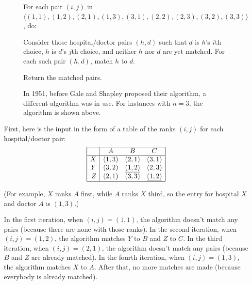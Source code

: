 \documentclass[11pt]{article}
\begin{document}
\begin{figure}
\begin{myframed}

\begin{steps}
  \step For each pair $(i,j)$ in $\langle (1,1), (1,2), (2,1), (1,3), (3,1), (2,2), (2,3), (3,2), (3,3) \rangle$, do:

  \begin{steps}
    \step Consider those hospital/doctor pairs $(h, d)$ such that $d$ is $h$'s $i$th choice,
    $h$ is $d$'s $j$th choice, and neither $h$ nor $d$ are yet matched.
    For each such pair $(h, d)$, match $h$ to $d$.
  \end{steps}

  \step Return the matched pairs.
\end{steps}

\end{myframed}
\caption{In 1951, before Gale and Shapley proposed their algorithm, a different algorithm was in use.  
  For instances with $n=3$, the algorithm is shown above.}\label{matching: fig: other alg}
\end{figure}

\solution
First, here is the input in the form of a table of the ranks $(i, j)$ for each hospital/doctor pair:
\[
\begin{array}{|r|ccc|} \hline
   & A & B & C \\ \hline
  X & (1,3) & (2,1) & (3,1) \\
  Y & (3,2) & \underline{(1,2)} & (2,3)\\
  Z & (2,1) & (3,3) & \underline{(1,2)} \\ \hline
\end{array}
\]

(For example, $X$ ranks $A$ first, while $A$ ranks $X$ third, so the entry for hospital $X$ and doctor $A$ is $(1, 3)$.)

In the first iteration, when $(i, j) = (1, 1)$, the algorithm doesn't match any pairs
(because there are none with those ranks).
In the second iteration, when $(i, j) = (1, 2)$, the algorithm matches $Y$ to $B$ and $Z$ to $C$.
In the third iteration, when $(i, j) = (2,1)$, the algorithm doesn't match any pairs
(because $B$ and $Z$ are already matched).
In the fourth iteration, when $(i, j) = (1,3)$, the algorithm matches $X$ to $A$.
After that, no more matches are made
(because everybody is already matched).
\end{document}
